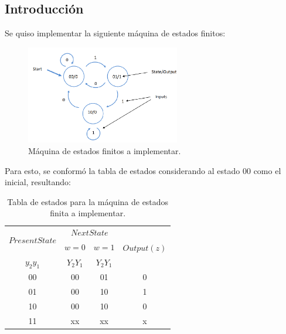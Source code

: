 



\subsection{Introducción}

Se quiso implementar la siguiente máquina de estados finitos:

\begin{figure}[H]
\centering
\includegraphics[width=0.6\textwidth]{ImagenesEjercicio3/fsm.png}
\caption{Máquina de estados finitos a implementar.}
\label{fig:fsm}
\end{figure} 

Para esto, se conformó la tabla de estados considerando al estado $00$ como el inicial, resultando:

\begin{table}[H]
\centering
\begin{tabular}{|c|l|c|l|c|l|c|}
\hline
\multicolumn{2}{|c|}{\multirow{2}{*}{$Present State$}} & \multicolumn{4}{c|}{$Next State$} & \multirow{3}{*}{$Output (z)$} \\ \cline{3-6}
\multicolumn{2}{|c|}{} & \multicolumn{2}{c|}{$w=0$} & \multicolumn{2}{c|}{$w=1$} &  \\
\multicolumn{2}{|c|}{$y_2 y_1$} & \multicolumn{2}{c|}{$Y_2Y_1$} & \multicolumn{2}{c|}{$Y_2Y_1$} &  \\ \hline
\multicolumn{2}{|c|}{00} & \multicolumn{2}{c|}{00} & \multicolumn{2}{c|}{01} & 0 \\ \hline
\multicolumn{2}{|c|}{01} & \multicolumn{2}{c|}{00} & \multicolumn{2}{c|}{10} & 1 \\ \hline
\multicolumn{2}{|c|}{10} & \multicolumn{2}{c|}{00} & \multicolumn{2}{c|}{10} & 0 \\ \hline
\multicolumn{2}{|c|}{11} & \multicolumn{2}{c|}{xx} & \multicolumn{2}{c|}{xx} & x \\ \hline
\end{tabular}
\caption{Tabla de estados para la máquina de estados finita a implementar.}
\label{fig:tablaestados}
\end{table}

